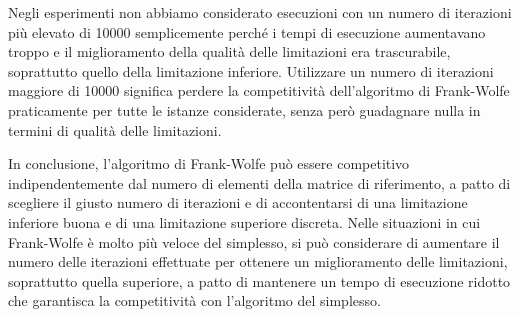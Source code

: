Negli esperimenti non abbiamo considerato esecuzioni con un numero di iterazioni più elevato di 10000 semplicemente
perché i tempi di esecuzione aumentavano troppo e il miglioramento della qualità delle limitazioni era trascurabile,
soprattutto quello della limitazione inferiore. Utilizzare un numero di iterazioni maggiore di 10000 significa perdere
la competitività dell'algoritmo di Frank-Wolfe praticamente per tutte le istanze considerate, senza però guadagnare
nulla in termini di qualità delle limitazioni.

In conclusione, l'algoritmo di Frank-Wolfe può essere competitivo indipendentemente dal numero di elementi della matrice
di riferimento, a patto di scegliere il giusto numero di iterazioni e di accontentarsi di una limitazione inferiore
buona e di una limitazione superiore discreta. Nelle situazioni in cui Frank-Wolfe è molto più veloce del simplesso, si
può considerare di aumentare il numero delle iterazioni effettuate per ottenere un miglioramento delle limitazioni,
soprattutto quella superiore, a patto di mantenere un tempo di esecuzione ridotto che garantisca la competitività con
l'algoritmo del simplesso.

